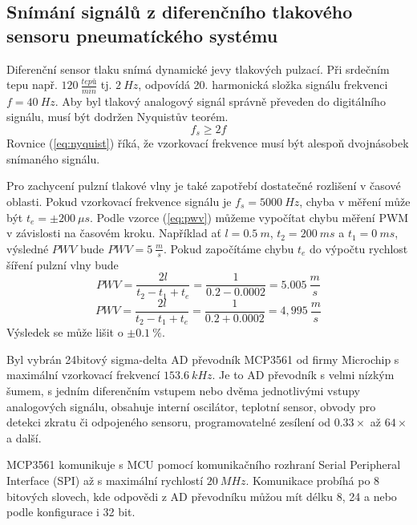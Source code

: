 \subsection{Snímání signálů z diferenčního tlakového sensoru pneumatíckého systému} \label{section:mcp3561_hw}
Diferenční sensor tlaku snímá dynamické jevy tlakových pulzací. Při srdečním tepu např. $120 \ \frac{tepů}{min}$ tj. $2 \ Hz$, odpovídá 20. harmonická složka signálu frekvenci  $f = 40 \ Hz$. Aby byl tlakový analogový signál správně převeden do digitálního signálu, musí být dodržen Nyquistův teorém.
\begin{equation} \label{eq:nyquist}
    f_s \geq 2f
\end{equation}
Rovnice (\ref{eq:nyquist}) říká, že vzorkovací frekvence musí být alespoň dvojnásobek snímaného signálu.
\par
Pro zachycení pulzní tlakové vlny je také zapotřebí dostatečné rozlišení v časové oblasti. Pokud vzorkovací frekvence signálu je $f_s = 5000 \ Hz$, chyba v měření může být $t_e = \pm 200 \ \mu s$. Podle vzorce (\ref{eq:pwv}) můžeme vypočítat chybu měření PWM v závislosti na časovém kroku.
Například ať $l = 0.5 \ m$, $t_2 = 200 \ ms$ a $t_1 = 0 \ ms$, výsledné $PWV$ bude $PWV = 5 \ \frac{m}{s}$. Pokud započítáme chybu $t_e$ do výpočtu rychlost šíření pulzní vlny bude
\begin{equation*}
    PWV = \frac{2l}{t_2 - t_1 + t_e} = \frac{1}{0.2 - 0.0002} = 5.005 \ \frac{m}{s}
\end{equation*}
\begin{equation*}
    PWV = \frac{2l}{t_2 - t_1 + t_e} = \frac{1}{0.2 + 0.0002} = 4,995 \ \frac{m}{s}
\end{equation*}
Výsledek se může lišit o $\pm 0.1 \ \%$.
\par
Byl vybrán 24bitový sigma-delta AD převodník MCP3561 od firmy Microchip s maximální vzorkovací frekvencí $153.6 \ kHz$. Je to AD převodník s velmi nízkým šumem, s jedním diferenčním vstupem nebo dvěma jednotlivými vstupy analogových signálu,
obsahuje interní oscilátor, teplotní sensor, obvody pro detekci zkratu či odpojeného sensoru, programovatelné zesílení od $0.33 \times$ až $64 \times$ a další.
\par
MCP3561 komunikuje s MCU pomocí komunikačního rozhraní Serial Peripheral Interface (SPI) až s maximální rychlostí $20 \ MHz$. Komunikace probíhá po 8 bitových slovech, kde odpovědi z AD převodníku můžou mít délku 8, 24 a nebo podle konfigurace i 32 bit.
